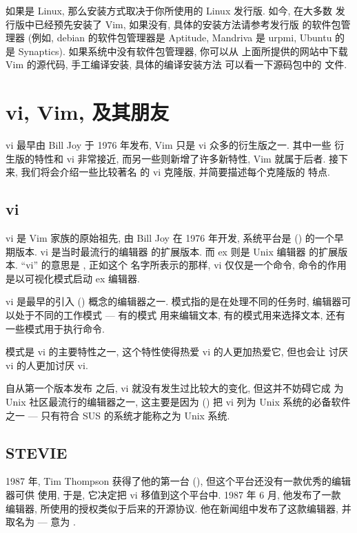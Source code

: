 如果是 Linux, 那么安装方式取决于你所使用的 Linux 发行版. 如今, 在大多数
发行版中已经预先安装了 Vim, 如果没有, 具体的安装方法请参考发行版
的软件包管理器 (例如, debian 的软件包管理器是 Aptitude, Mandriva 是
urpmi, Ubuntu 的是 Synaptics). 如果系统中没有软件包管理器, 你可以从
上面所提供的网站中下载 Vim 的源代码, 手工编译安装, 具体的编译安装方法
可以看一下源码包中的  文件.

\section{vi, Vim, 及其朋友}
\label{sec:vi_vim_and_friends}
vi 最早由 Bill Joy 于 1976 年发布, Vim 只是 vi 众多的衍生版之一. 其中一些
衍生版的特性和 vi 非常接近, 而另一些则新增了许多新特性, Vim 就属于后者.
接下来, 我们将会介绍一些比较著名 的 vi 克隆版, 并简要描述每个克隆版的
特点.
\subsection{vi}
\label{subsec:vi}
vi 是 Vim 家族的原始祖先, 由 Bill Joy 在 1976 年开发, 系统平台是 
 () 的一个早期版本.
vi 是当时最流行的编辑器  的扩展版本. 而 ex 则是 Unix 编辑器 
 的扩展版本. ``vi'' 的意思是 , 正如这个
名字所表示的那样, vi 仅仅是一个命令, 命令的作用是以可视化模式启动 ex 
编辑器.

vi 是最早的引入 () 概念的编辑器之一.
模式指的是在处理不同的任务时, 编辑器可以处于不同的工作模式 --- 有的模式
用来编辑文本, 有的模式用来选择文本, 还有一些模式用于执行命令.

模式是 vi 的主要特性之一, 这个特性使得热爱 vi 的人更加热爱它, 但也会让
讨厌 vi 的人更加讨厌 vi.

自从第一个版本发布 之后, vi 就没有发生过比较大的变化, 但这并不妨碍它成
为 Unix 社区最流行的编辑器之一, 这主要是因为  () 把 vi 列为 Unix 系统的必备软件之一 --- 只有符合 
SUS 的系统才能称之为 Unix 系统.

\subsection{STEVIE}
\label{subsec:stevie}
1987 年, Tim Thompson 获得了他的第一台 
(), 但这个平台还没有一款优秀的编辑器可供
使用, 于是, 它决定把 vi 移值到这个平台中. 1987 年 6 月, 他发布了一款
编辑器, 所使用的授权类似于后来的开源协议. 他在新闻组中发布了这款编辑器,
并取名为  --- 意为 .


